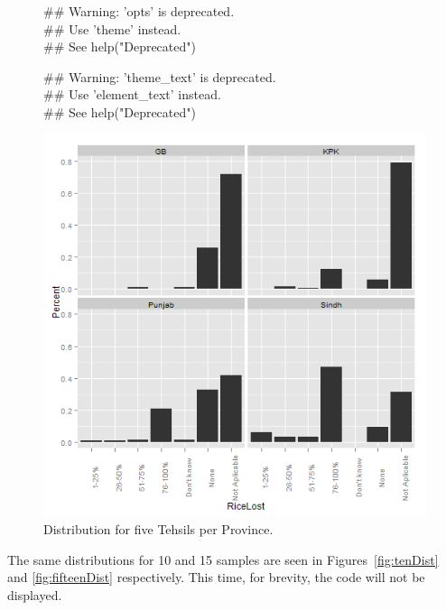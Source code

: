 \begin{figure}[!hbt]
\begin{knitrout}
\color{fgcolor}\begin{kframe}


{\ttfamily\noindent\textcolor{warningcolor}{\#\# Warning: 'opts' is deprecated.\\\#\# Use 'theme' instead.\\\#\# See help("Deprecated")}}

{\ttfamily\noindent\textcolor{warningcolor}{\#\# Warning: 'theme\_text' is deprecated.\\\#\# Use 'element\_text' instead.\\\#\# See help("Deprecated")}}\end{kframe}\includegraphics[width=.9\linewidth]{smallerDist/figures/fiveDistPlot} 
\end{knitrout}

\caption{Distribution for five Tehsils per Province.\label{fig:fiveDist}}
\end{figure}

The same distributions for 10 and 15 samples are seen in Figures~\ref{fig:tenDist} and \ref{fig:fifteenDist} respectively.  This time, for brevity, the code will not be displayed.

